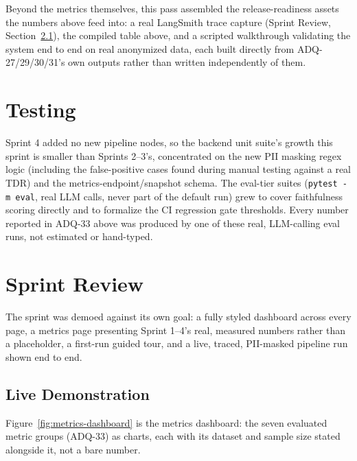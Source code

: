 Beyond the metrics themselves, this pass assembled the
release-readiness assets the numbers above feed into: a real LangSmith
trace capture (Sprint Review, Section~\ref{sec:live-demo-sprint4}), the
compiled table above, and a scripted walkthrough validating the system
end to end on real anonymized data, each built directly from
ADQ-27/29/30/31's own outputs rather than written independently of
them.

\section{Testing}
\label{sec:s4-testing}

Sprint 4 added no new pipeline nodes, so the backend unit suite's growth
this sprint is smaller than Sprints 2--3's, concentrated on the new PII
masking regex logic (including the false-positive cases found during
manual testing against a real TDR) and the metrics-endpoint/snapshot
schema. The eval-tier suites (\texttt{pytest -m eval}, real LLM calls,
never part of the default run) grew to cover faithfulness scoring
directly and to formalize the CI regression gate thresholds. Every
number reported in ADQ-33 above was produced by one of these real,
LLM-calling eval runs, not estimated or hand-typed.

\section{Sprint Review}

The sprint was demoed against its own goal: a fully styled dashboard
across every page, a metrics page presenting Sprint 1--4's real,
measured numbers rather than a placeholder, a first-run guided tour, and
a live, traced, PII-masked pipeline run shown end to end.

\subsection{Live Demonstration}
\label{sec:live-demo-sprint4}


Figure~\ref{fig:metrics-dashboard} is the metrics dashboard: the seven
evaluated metric groups (ADQ-33) as charts, each with its dataset and
sample size stated alongside it, not a bare number.

